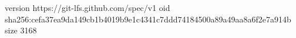 version https://git-lfs.github.com/spec/v1
oid sha256:cefa37ea9da149cb1b4019b9e1c4341c7ddd74184500a89a49aa8a6f2e7a914b
size 3168

